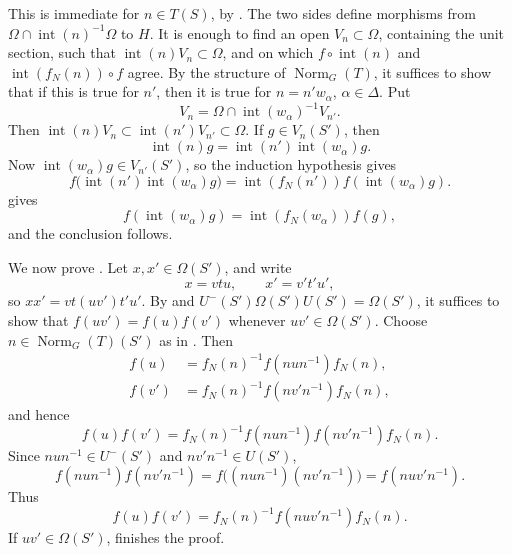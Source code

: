 This is immediate for \(n\in T(S)\), by . The two sides define
morphisms from
\(\Omega\cap\operatorname{int}(n)^{-1}\Omega\) to \(H\). It is
enough to find an open \(V_n\subset\Omega\), containing the unit
section, such that \(\operatorname{int}(n)V_n\subset\Omega\), and on
which \(f\circ\operatorname{int}(n)\) and
\(\operatorname{int}(f_N(n))\circ f\) agree. By the structure of
\(\operatorname{Norm}_G(T)\), it suffices to show that if this is true
for \(n'\), then it is true for \(n=n'w_\alpha\),
\(\alpha\in\Delta\). Put
\[
  V_n=\Omega\cap\operatorname{int}(w_\alpha)^{-1}V_{n'}.
\]
Then
\(\operatorname{int}(n)V_n\subset\operatorname{int}(n')V_{n'}
\subset\Omega\). If \(g\in V_n(S')\), then
\[
  \operatorname{int}(n)g
   =\operatorname{int}(n')\operatorname{int}(w_\alpha)g.
\]
Now \(\operatorname{int}(w_\alpha)g\in V_{n'}(S')\), so the
induction hypothesis gives
\[
  f\bigl(\operatorname{int}(n')\operatorname{int}(w_\alpha)g\bigr)
   =\operatorname{int}(f_N(n'))f(\operatorname{int}(w_\alpha)g).
\]
 gives
\[
  f(\operatorname{int}(w_\alpha)g)
   =\operatorname{int}(f_N(w_\alpha))f(g),
\]
and the conclusion follows.

We now prove . Let \(x,x'\in\Omega(S')\), and write
\[
  x=vtu,\qquad x'=v't'u',
\]
so \(xx'=vt(uv')t'u'\). By  and
\(U^-(S')\Omega(S')U(S')=\Omega(S')\), it suffices to show that
\(f(uv')=f(u)f(v')\) whenever \(uv'\in\Omega(S')\). Choose
\(n\in\operatorname{Norm}_G(T)(S')\) as in . Then
\[
\begin{aligned}
 f(u)&=f_N(n)^{-1}f(nun^{-1})f_N(n),\\
 f(v')&=f_N(n)^{-1}f(nv'n^{-1})f_N(n),
\end{aligned}
\]
and hence
\[
 f(u)f(v')=f_N(n)^{-1}f(nun^{-1})f(nv'n^{-1})f_N(n).
\]
Since \(nun^{-1}\in U^-(S')\) and \(nv'n^{-1}\in U(S')\),
\[
 f(nun^{-1})f(nv'n^{-1})
   =f\bigl((nun^{-1})(nv'n^{-1})\bigr)
   =f(nuv'n^{-1}).
\]
Thus
\[
  f(u)f(v')=f_N(n)^{-1}f(nuv'n^{-1})f_N(n).
\]
If \(uv'\in\Omega(S')\),  finishes the proof.


